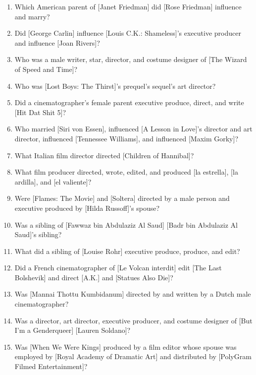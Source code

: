 \documentclass[letterpaper]{article}
\begin{document}
\begin{enumerate}
    \item Which American parent of [Janet Friedman] did [Rose Friedman] influence and marry?
    \item Did [George Carlin] influence [Louis C.K.: Shameless]'s executive producer and influence [Joan Rivers]?
    \item Who was a male writer, star, director, and costume designer of [The Wizard of Speed and Time]?
    \item Who was [Lost Boys: The Thirst]'s prequel's sequel's art director?
    \item Did a cinematographer's female parent executive produce, direct, and write [Hit Dat Shit 5]?
    \item Who married [Siri von Essen], influenced [A Lesson in Love]'s director and art director, influenced [Tennessee Williams], and influenced [Maxim Gorky]?
    \item What Italian film director directed [Children of Hannibal]?
    \item What film producer directed, wrote, edited, and produced [la estrella], [la ardilla], and [el valiente]?
    \item Were [Flames: The Movie] and [Soltera] directed by a male person and executive produced by [Hilda Russoff]'s spouse?
    \item Was a sibling of [Fawwaz bin Abdulaziz Al Saud] [Badr bin Abdulaziz Al Saud]'s sibling?
    \item What did a sibling of [Louise Rohr] executive produce, produce, and edit?
    \item Did a French cinematographer of [Le Volcan interdit] edit [The Last Bolshevik] and direct [A.K.] and [Statues Also Die]?
    \item Was [Mannai Thottu Kumbidanum] directed by and written by a Dutch male cinematographer?
    \item Was a director, art director, executive producer, and costume designer of [But I'm a Genderqueer] [Lauren Soldano]?
    \item Was [When We Were Kings] produced by a film editor whose spouse was employed by [Royal Academy of Dramatic Art] and distributed by [PolyGram Filmed Entertainment]?
\end{enumerate}
\end{document}
